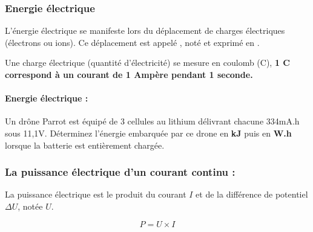\documentclass[10pt,fleqn]{article} %
\begin{document}
\subsubsection{Energie électrique}
\begin{defi}
  L'énergie électrique se manifeste lors du déplacement de charges électriques (électrons ou ions). Ce déplacement est appelé , noté  et exprimé en .

Une charge électrique (quantité d'électricité) se mesure en coulomb (C), \textbf{1 C correspond à un courant de 1 Ampère pendant 1 seconde.}
\end{defi}

\begin{defi}
  \paragraph{Energie électrique : } 
\end{defi}


\begin{exemple}
    

Un drône Parrot est équipé de 3 cellules au lithium délivrant chacune 334mA.h sous 11,1V. Déterminez l'énergie embarquée par ce drone en \textbf{kJ} puis en \textbf{W.h} lorsque la batterie est entièrement chargée. 

\afaire {}

\correction {}

\end{exemple}

\subsubsection{La puissance électrique d'un courant continu : }
La puissance électrique est le produit du courant \textbf{$I$} et de la différence de potentiel $\Delta U$, notée \textbf{$U$}. 

\begin{equation*}
    P = U\times I
\end{equation*}
\pagebreak
\end{document}

